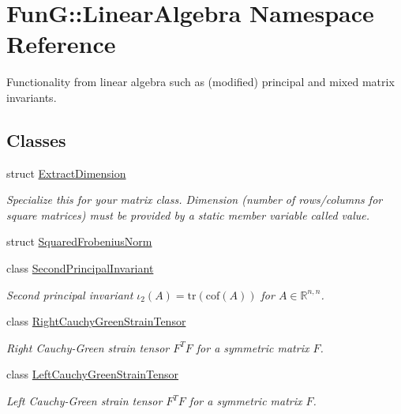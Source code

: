 \hypertarget{namespaceFunG_1_1LinearAlgebra}{\section{\-Fun\-G\-:\-:\-Linear\-Algebra \-Namespace \-Reference}
\label{namespaceFunG_1_1LinearAlgebra}
}


\-Functionality from linear algebra such as (modified) principal and mixed matrix invariants.  


\subsection*{\-Classes}
\begin{DoxyCompactItemize}
\item 
struct \hyperlink{structFunG_1_1LinearAlgebra_1_1ExtractDimension}{\-Extract\-Dimension}
\begin{DoxyCompactList}\small\item\em \-Specialize this for your matrix class. \-Dimension (number of rows/columns for square matrices) must be provided by a static member variable called value. \end{DoxyCompactList}\item 
struct \hyperlink{structFunG_1_1LinearAlgebra_1_1SquaredFrobeniusNorm}{\-Squared\-Frobenius\-Norm}
\item 
class \hyperlink{classFunG_1_1LinearAlgebra_1_1SecondPrincipalInvariant}{\-Second\-Principal\-Invariant}
\begin{DoxyCompactList}\small\item\em \-Second principal invariant $ \iota_2(A)=\mathrm{tr}(\mathrm{cof}(A)) $ for $A\in\mathbb{R}^{n,n}$. \end{DoxyCompactList}\item 
class \hyperlink{classFunG_1_1LinearAlgebra_1_1RightCauchyGreenStrainTensor}{\-Right\-Cauchy\-Green\-Strain\-Tensor}
\begin{DoxyCompactList}\small\item\em \-Right \-Cauchy-\/\-Green strain tensor $ F^T F $ for a symmetric matrix $ F $. \end{DoxyCompactList}\item 
class \hyperlink{classFunG_1_1LinearAlgebra_1_1LeftCauchyGreenStrainTensor}{\-Left\-Cauchy\-Green\-Strain\-Tensor}
\begin{DoxyCompactList}\small\item\em \-Left \-Cauchy-\/\-Green strain tensor $ F^T F $ for a symmetric matrix $ F $. \end{DoxyCompactList}\item 

\end{DoxyCompactItemize}
